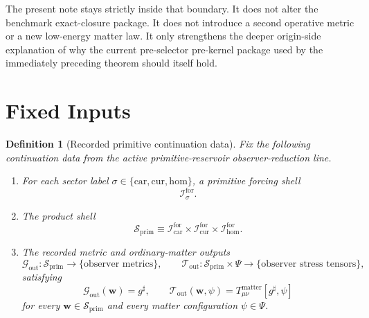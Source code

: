 \documentclass[11pt]{article}
\newcommand{\CompletedMetric}{g^{\sharp}}
\newcommand{\MatterSpace}{\Psi}
\newcommand{\Car}{\mathrm{car}}
\newcommand{\Cur}{\mathrm{cur}}
\newcommand{\Hom}{\mathrm{hom}}
\newcommand{\ForSpace}[1]{\mathcal I_{#1}^{\mathrm{for}}}
\newcommand{\PrimShell}{\mathcal S_{\mathrm{prim}}}
\newcommand{\MetricOut}{\mathscr G_{\mathrm{out}}}
\newcommand{\MatterOut}{\mathscr T_{\mathrm{out}}}
\newtheorem{definition}{Definition}
\begin{document}
The present note stays strictly inside that boundary. It does not alter the benchmark exact-closure package. It does not introduce a second operative metric or a new low-energy matter law. It only strengthens the deeper origin-side explanation of why the current pre-selector pre-kernel package used by the immediately preceding theorem should itself hold.

\section{Fixed Inputs}

\begin{definition}[Recorded primitive continuation data]
\label{def:fixed}
Fix the following continuation data from the active primitive-reservoir observer-reduction line.
\begin{enumerate}
    \item For each sector label \(\sigma\in\{\Car,\Cur,\Hom\}\), a primitive forcing shell
    \[
    \ForSpace{\sigma}.
    \]
    \item The product shell
    \[
    \PrimShell
    \equiv
    \ForSpace{\Car}\times \ForSpace{\Cur}\times \ForSpace{\Hom}.
    \]
    \item The recorded metric and ordinary-matter outputs
    \[
    \MetricOut:\PrimShell\to\{\text{observer metrics}\},
    \qquad
    \MatterOut:\PrimShell\times\MatterSpace\to\{\text{observer stress tensors}\},
    \]
    satisfying
    \begin{equation}
    \MetricOut(\mathbf w)=\CompletedMetric,
    \qquad
    \MatterOut(\mathbf w,\psi)
    =
    T_{\mu\nu}^{\mathrm{matter}}[\CompletedMetric,\psi]
    \label{eq:fixedoutputs}
    \end{equation}
    for every \(\mathbf w\in\PrimShell\) and every matter configuration \(\psi\in\MatterSpace\).
\end{enumerate}
\end{definition}
\end{document}
